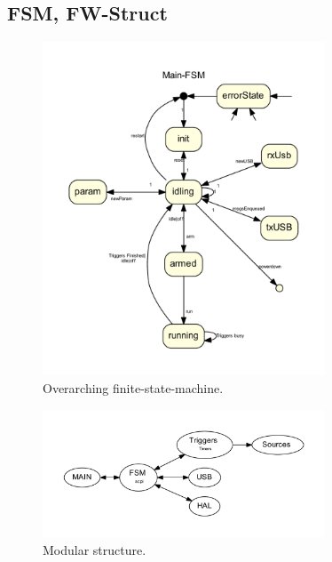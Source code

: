 	\subsection{FSM, FW-Struct}
		\begin{figure}[H]
			\center
			\includegraphics[width=0.75\textwidth]{src/_mainFSM_neato.pdf}
			\caption{Overarching finite-state-machine.}
			\label{fig:FSM}
		\end{figure}


		\begin{figure}[H]
			\center
			\includegraphics[width=0.75\textwidth]{src/_FW-Modules.pdf}
			\caption{Modular structure.}
			\label{fig:_FW-Modules}
		\end{figure}
	


